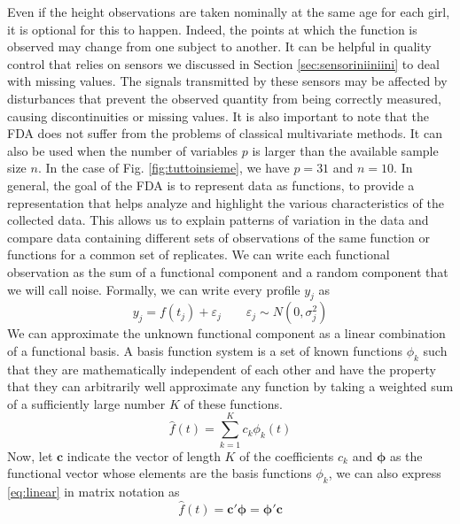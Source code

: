 Even if the height observations are taken nominally at the same age for each girl, it is optional for this to happen. Indeed, the points at which the function is observed may change from one subject to another. It can be helpful in quality control that relies on sensors we discussed in Section \ref{sec:sensoriniiniini} to deal with missing values. The signals transmitted by these sensors may be affected by disturbances that prevent the observed quantity from being correctly measured, causing discontinuities or missing values. It is also important to note that the FDA does not suffer from the problems of classical multivariate methods. It can also be used when the number of variables $p$ is larger than the available sample size $n$. In the case of Fig. \ref{fig:tuttoinsieme}, we have $p=31$ and $n=10$. In general, the goal of the FDA is to represent data as functions, to provide a representation that helps analyze and highlight the various characteristics of the collected data. This allows us to explain patterns of variation in the data and compare data containing different sets of observations of the same function or functions for a common set of replicates. We can write each functional observation as the sum of a functional component and a random component that we will call noise. Formally, we can write every profile $y_j$ as 
\begin{equation}
    y_j = f(t_j) + \varepsilon_j \qquad \varepsilon_j\sim N(0, \sigma_j^2)
\end{equation}
We can approximate the unknown functional component as a linear combination of a functional basis. A basis function system is a set of known functions $\phi_k$ such that they are mathematically independent of each other and have the property that they can arbitrarily well approximate any function by taking a weighted sum of a sufficiently large number $K$ of these functions.
\begin{equation}
\label{eq:linear}
    \hat{f}(t)=\sum_{k=1}^K c_k \phi_k(t)
\end{equation}
Now, let $\mathbf{c}$ indicate the vector of length $K$ of the coefficients $c_k$ and $\bm{\phi}$ as the functional vector whose elements are the basis functions $\phi_k$, we can also express \ref{eq:linear} in matrix notation as
\begin{equation}
\label{eq:matrice}
    \hat{f}(t)=\mathbf{c}'\bm{\phi}=\bm{\phi}'\mathbf{c}
\end{equation}
